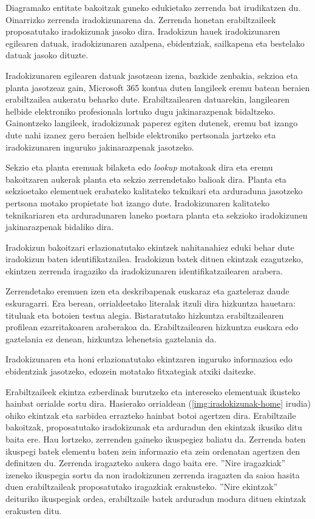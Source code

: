 Diagramako entitate bakoitzak guneko edukietako zerrenda bat irudikatzen du. Oinarrizko zerrenda iradokizunarena da.
Zerrenda honetan erabiltzaileek proposatutako iradokizunak jasoko dira.
Iradokizun hauek iradokizunaren egilearen datuak, iradokizunaren azalpena, ebidentziak, sailkapena eta bestelako datuak jasoko dituzte.

Iradokizunaren egilearen datuak jasotzean izena, bazkide zenbakia, sekzioa eta planta jasotzeaz gain, Microsoft 365 kontua duten langileek eremu batean beraien
erabiltzailea aukeratu beharko dute. Erabiltzailearen datuarekin, langilearen helbide elektroniko profesionala lortuko dugu jakinarazpenak bidaltzeko.
Gainontzeko langileek, iradokizunak paperez egiten dutenek, eremu bat izango dute nahi izanez gero beraien helbide elektroniko pertsonala jartzeko eta iradokizunaren inguruko jakinarazpenak jasotzeko.

Sekzio eta planta eremuak bilaketa edo \textit{lookup} motakoak dira eta eremu bakoitzaren aukerak planta eta sekzio zerrendetako balioak dira. Planta eta sekzioetako elementuek erabateko kalitateko teknikari eta arduraduna jasotzeko pertsona motako propietate bat izango dute.
Iradokizunaren kalitateko teknikariaren eta arduradunaren laneko postara planta eta sekzioko iradokizunen jakinarazpenak bidaliko dira.

Iradokizun bakoitzari erlazionatutako ekintzek nahitanahiez eduki behar dute iradokizun baten identifikatzailea.
Iradokizun batek dituen ekintzak ezagutzeko, ekintzen zerrenda iragaziko da iradokizunaren identifikatzailearen arabera.

Zerrendetako eremuen izen eta deskribapenak euskaraz eta gazteleraz daude eskuragarri.
Era berean, orrialdeetako literalak itzuli dira hizkuntza hauetara: tituluak eta botoien testua alegia. 
Bistaratutako hizkuntza erabiltzailearen profilean ezarritakoaren araberakoa da.
Erabiltzailearen hizkuntza euskara edo gaztelania ez denean, hizkuntza lehenetsia gaztelania da. 

Iradokizunaren eta honi erlazionatutako ekintzaren inguruko informazioa edo ebidentziak jasotzeko, edozein motatako fitxategiak atxiki daitezke.

Erabiltzaileek ekintza ezberdinak burutzeko eta intereseko elementuak ikusteko hainbat orrialde sortu dira. Hasierako orrialdean (\ref{img:iradokizunak-home} irudia) ohiko ekintzak eta sarbidea errazteko hainbat botoi agertzen dira. Erabiltzaile bakoitzak, proposatutako iradokizunak eta arduradun den ekintzak ikusiko ditu baita ere. Hau lortzeko, zerrenden gaineko ikuspegiez baliatu da. Zerrenda baten ikuspegi batek elementu baten zein informazio eta zein ordenatan agertzen den definitzen du. Zerrenda iragazteko aukera dago baita ere. ''Nire iragazkiak'' izeneko ikuspegia sortu da non iradokizunen zerrenda iragazten da saioa hasita duen erabiltzaileak proposatutako iragazkiak erakusteko. ''Nire ekintzak'' deituriko ikuspegiak ordea, erabiltzaile batek arduradun modura dituen ekintzak erakusten ditu. 

